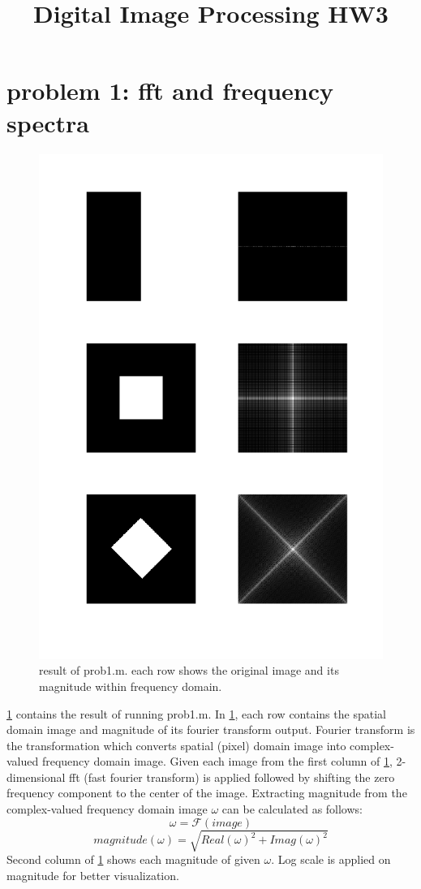 \documentclass[extendedabs]{bmvc2k}
\begin{document}
\title{Digital Image Processing HW3}

\maketitle
\vspace{-0.2in}

\section*{problem 1: fft and frequency spectra}

\begin{figure}[h]
    \centering
    \includegraphics[width=0.7\linewidth]{hw3_1_1}
    \caption{result of prob1.m. each row shows the original image and its magnitude 
    within frequency domain.}
    \label{fig:1}
\end{figure}

\figurename{\ref{fig:1}} contains the result of running prob1.m.
In \figurename{\ref{fig:1}}, each row contains the spatial domain image and magnitude of its fourier transform output. 
Fourier transform is the transformation which converts spatial (pixel) domain image into complex-valued 
frequency domain image.
Given each image from the first column of \figurename{\ref{fig:1}}, 2-dimensional fft (fast fourier transform)
is applied followed by shifting the zero frequency component to the center of the image.
Extracting magnitude from the complex-valued frequency domain image $\omega$ can be calculated as follows:
\[\omega = \mathcal{F}(image)\]
\[magnitude(\omega) = \sqrt{Real(\omega)^2 + Imag(\omega)^2}\]
Second column of \figurename{\ref{fig:1}} shows each magnitude of given $\omega$. Log scale is applied on
magnitude for better visualization.
\end{document}
